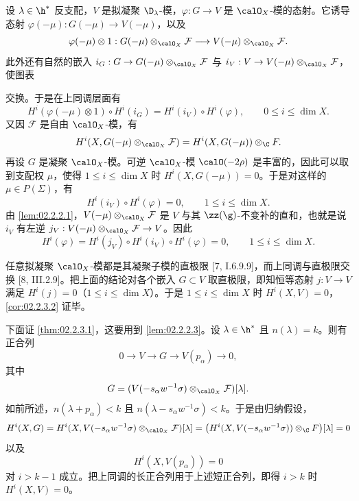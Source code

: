 设 $\lambda\in\h^*$ 反支配，$V$ 是拟凝聚 $\D_\lambda$-模，$\varphi:G\to V$ 是 $\calO_X$-模的态射。它诱导态射 $\varphi(-\mu):G(-\mu)\to V(-\mu)$，以及
\[
\varphi(-\mu)\otimes 1:G(-\mu)\otimes_{\calO_X}\mathcal{F}\longrightarrow V(-\mu)\otimes_{\calO_X}\mathcal{F} .
\]
此外还有自然的嵌入 $i_G:G\to G(-\mu)\otimes_{\calO_X}\mathcal{F}$ 与 $i_V:V\to V(-\mu)\otimes_{\calO_X}\mathcal{F}$，使图表
\begin{center}
\end{center}
交换。于是在上同调层面有
\[
H^i(\varphi(-\mu)\otimes1)\circ H^i(i_G)=H^i(i_V)\circ H^i(\varphi),
\qquad 0\le i\le\dim X.
\]
又因 $\mathcal{F}$ 是自由 $\calO_X$-模，有
\[
H^i(X,G(-\mu)\otimes_{\calO_X}\mathcal{F})=H^i(X,G(-\mu))\otimes_\C F .
\]
再设 $G$ 是凝聚 $\calO_X$-模。可逆 $\calO_X$-模 $\calO(-2\rho)$ 是丰富的，因此可以取到支配权 $\mu$，使得 $1\le i\le\dim X$ 时 $H^i(X,G(-\mu))=0$。于是对这样的 $\mu\in P(\Sigma)$，有
\[
H^i(i_V)\circ H^i(\varphi)=0,\qquad 1\le i\le\dim X.
\]
由 \ref{lem:02.2.2.1}，$V(-\mu)\otimes_{\calO_X}\mathcal{F}$ 是 $V$ 与其 $\zz(\g)$-不变补的直和，也就是说 $i_V$ 有左逆 $j_V:V(-\mu)\otimes_{\calO_X}\mathcal{F}\to V$。因此
\[
H^i(\varphi)=H^i(j_V)\circ H^i(i_V)\circ H^i(\varphi)=0,\qquad 1\le i\le\dim X.
\]

任意拟凝聚 $\calO_X$-模都是其凝聚子模的直极限 [7, I.6.9.9]，而上同调与直极限交换 [8, III.2.9]。把上面的结论对各个嵌入 $G\subset V$ 取直极限，即知恒等态射 $j:V\to V$ 满足 $H^i(j)=0$（$1\le i\le\dim X$）。于是 $1\le i\le\dim X$ 时 $H^i(X,V)=0$，\ref{cor:02.2.3.2} 证毕。

下面证 \ref{thm:02.2.3.1}，这要用到 \ref{lem:02.2.2.3}。设 $\lambda\in\h^*$ 且 $n(\lambda)=k$。则有正合列
\[
0\longrightarrow V\longrightarrow G\longrightarrow V(p_\alpha)\longrightarrow 0,
\]
其中
\[
G=(V(-s_\alpha w^{-1}\sigma)\otimes_{\calO_X}\mathcal{F})[\lambda].
\]
如前所述，$n(\lambda+p_\alpha)<k$ 且 $n(\lambda-s_\alpha w^{-1}\sigma)<k$。于是由归纳假设，
\[
H^i(X,G)=H^i(X,V(-s_\alpha w^{-1}\sigma)\otimes_{\calO_X}\mathcal{F})[\lambda]
=\bigl(H^i(X,V(-s_\alpha w^{-1}\sigma))\otimes_\C F\bigr)[\lambda]=0
\]
以及
\[
H^i(X,V(p_\alpha))=0
\]
对 $i>k-1$ 成立。把上同调的长正合列用于上述短正合列，即得 $i>k$ 时 $H^i(X,V)=0$。

